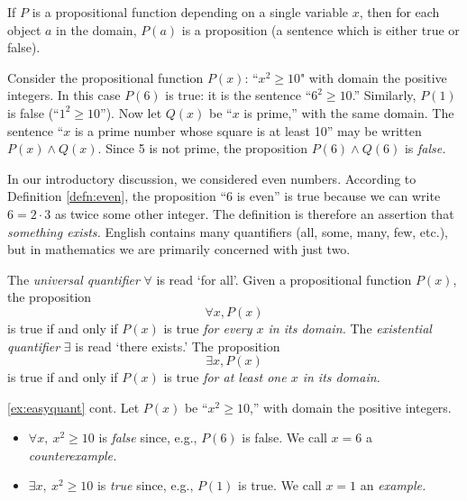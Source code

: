 If $P$ is a propositional function depending on a single variable $x$, then for each object $a$ in the domain, $P(a)$ is a proposition (a sentence which is either true or false).

\begin{example}{}{}
	Consider the propositional function $P(x)$: ``$x^2\ge 10$" with domain the positive integers. 
	In this case $P(6)$ is true: it is the sentence ``$6^2\ge 10$.'' Similarly, $P(1)$ is false (``$1^2\ge 10$'').\smallbreak
	Now let $Q(x)$ be ``$x$ is prime,'' with the same domain. The sentence ``$x$ is a prime number whose square is at least 10'' may be written $P(x)\wedge Q(x)$. Since 5 is not prime, the proposition $P(6)\wedge Q(6)$ is \emph{false.}
\end{example}


In our introductory discussion, we considered even numbers. According to Definition \ref{defn:even}, the proposition ``6 is even'' is true because we can write $6=2\cdot 3$ as twice some other integer. The definition is therefore an assertion that \emph{something exists.} English contains many quantifiers (all, some, many, few, etc.), but in mathematics we are primarily concerned with just two.

\begin{defn}{}{}
	The \emph{universal quantifier} $\forall$ is read `for all'. Given a propositional function $P(x)$, the proposition
	\[
		\forall x, P(x)\tag{``for all $x$, $P(x)$ (is true)''}
	\]
	is true if and only if $P(x)$ is true \emph{for every $x$ in its domain.}\smallbreak
	The \emph{existential quantifier} $\exists$ is read `there exists.' The proposition
	\[
		\exists x, P(x)\tag{``there is an $x$ such that $P(x)$ (is true)''}
	\]
	is true if and only if $P(x)$ is true \emph{for at least one $x$ in its domain.}
\end{defn}

\begin{example*}{\ref{ex:easyquant} cont.}{}
	Let $P(x)$ be ``$x^2\ge 10$,'' with domain the positive integers.
	\begin{itemize}
	  \item $\forall x,\ x^2\ge 10$ is \emph{false} since, e.g., $P(6)$ is false. We call $x=6$ a \emph{counterexample.}
	  \item $\exists x,\ x^2\ge 10$ is \emph{true} since, e.g., $P(1)$ is true. We call $x=1$ an \emph{example.}	  
	\end{itemize}
\end{example*}

